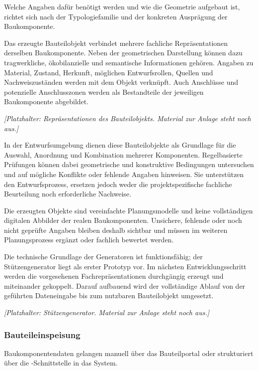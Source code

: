 \documentclass[type=zwischenbericht]{zukunftbau}
\begin{document}
Welche Angaben dafür benötigt werden und wie die Geometrie aufgebaut ist, richtet sich nach der Typologiefamilie und der konkreten Ausprägung der Baukomponente.

Das erzeugte Bauteilobjekt verbindet mehrere fachliche Repräsentationen derselben Baukomponente. Neben der geometrischen Darstellung können dazu tragwerkliche, ökobilanzielle und semantische Informationen gehören. Angaben zu Material, Zustand, Herkunft, möglichen Entwurfsrollen, Quellen und Nachweiszuständen werden mit dem Objekt verknüpft. Auch Anschlüsse und potenzielle Anschlusszonen werden als Bestandteile der jeweiligen Baukomponente abgebildet.

\begin{Figure}[title=Repräsentationen des Bauteilobjekts]
\textit{[Platzhalter: Repräsentationen des Bauteilobjekts. Material zur Anlage steht noch aus.]}
\end{Figure}

In der Entwurfsumgebung dienen diese Bauteilobjekte als Grundlage für die Auswahl, Anordnung und Kombination mehrerer Komponenten. Regelbasierte Prüfungen können dabei geometrische und konstruktive Bedingungen untersuchen und auf mögliche Konflikte oder fehlende Angaben hinweisen. Sie unterstützen den Entwurfsprozess, ersetzen jedoch weder die projektspezifische fachliche Beurteilung noch erforderliche Nachweise.

Die erzeugten Objekte sind vereinfachte Planungsmodelle und keine vollständigen digitalen Abbilder der realen Baukomponenten. Unsichere, fehlende oder noch nicht geprüfte Angaben bleiben deshalb sichtbar und müssen im weiteren Planungsprozess ergänzt oder fachlich bewertet werden.

Die technische Grundlage der Generatoren ist funktionsfähig; der Stützengenerator liegt als erster Prototyp vor. Im nächsten Entwicklungsschritt werden die vorgesehenen Fachrepräsentationen durchgängig erzeugt und miteinander gekoppelt. Darauf aufbauend wird der vollständige Ablauf von der geführten Dateneingabe bis zum nutzbaren Bauteilobjekt umgesetzt.

\begin{Figure}[title=Stützengenerator]
\textit{[Platzhalter: Stützengenerator. Material zur Anlage steht noch aus.]}
\end{Figure}

\subsubsection{Bauteileinspeisung}
Baukomponentendaten gelangen manuell über das Bauteilportal oder strukturiert über die -Schnittstelle in das System.
\end{document}
